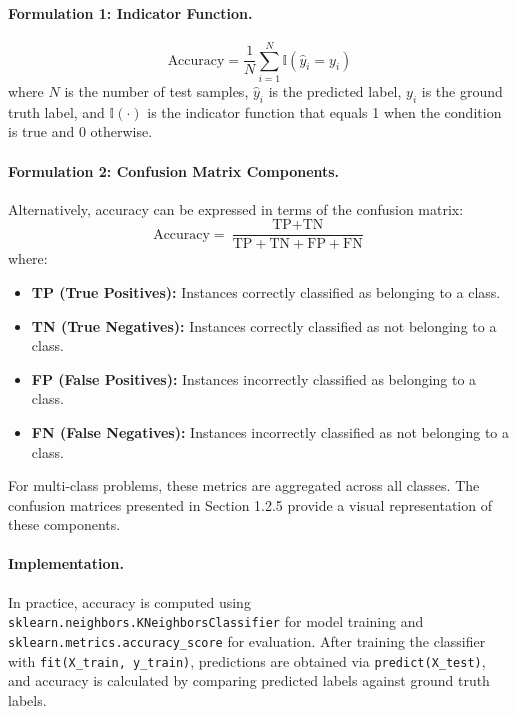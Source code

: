 \documentclass[12pt]{article}
\begin{document}
\paragraph{Formulation 1: Indicator Function.}
\begin{equation}
    \text{Accuracy} = \frac{1}{N} \sum_{i=1}^{N} \mathbb{I}(\hat{y}_i = y_i)
\end{equation}
where $N$ is the number of test samples, $\hat{y}_i$ is the predicted label, $y_i$ is the ground truth label, and $\mathbb{I}(\cdot)$ is the indicator function that equals 1 when the condition is true and 0 otherwise.

\paragraph{Formulation 2: Confusion Matrix Components.}
Alternatively, accuracy can be expressed in terms of the confusion matrix:
\begin{equation}
    \text{Accuracy} = \frac{\text{TP} + \text{TN}}{\text{TP} + \text{TN} + \text{FP} + \text{FN}}
\end{equation}
where:
\begin{itemize}
    \item \textbf{TP (True Positives):} Instances correctly classified as belonging to a class.
    \item \textbf{TN (True Negatives):} Instances correctly classified as not belonging to a class.
    \item \textbf{FP (False Positives):} Instances incorrectly classified as belonging to a class.
    \item \textbf{FN (False Negatives):} Instances incorrectly classified as not belonging to a class.
\end{itemize}

For multi-class problems, these metrics are aggregated across all classes. The confusion matrices presented in Section 1.2.5 provide a visual representation of these components.

\paragraph{Implementation.} In practice, accuracy is computed using \texttt{sklearn.neighbors.KNeighborsClassifier} for model training and \texttt{sklearn.metrics.accuracy\_score} for evaluation. After training the classifier with \texttt{fit(X\_train, y\_train)}, predictions are obtained via \texttt{predict(X\_test)}, and accuracy is calculated by comparing predicted labels against ground truth labels.
\end{document}
